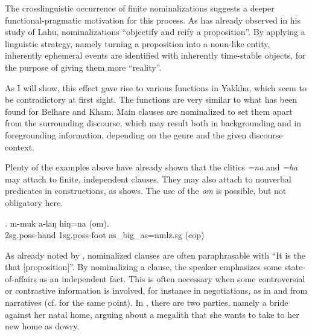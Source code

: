  The crosslinguistic occurrence of finite nominalizations suggests a deeper func\-tional-prag\-matic motivation for this process. As \citet[246]{Matisoff1972Lahu} has already observed in his study of Lahu, nominalizations “objectify and reify a proposition”. By applying a linguistic strategy, namely turning a proposition into a noun-like entity, inherently ephemeral events are identified with inherently time-stable objects, for the purpose of giving them more “reality”. 
 
As I will show, this effect gave rise to various functions in Yakkha, which seem to be  contradictory at first sight. The functions are very similar to what has been found for Belhare and Kham. Main clauses are nominalized to set them apart from the surrounding discourse, which may result both in backgrounding and in foregrounding information, depending on the genre and the given discourse context.

 




Plenty of the examples above have already shown that the clitics \emph{=na} and \emph{=ha} may attach to finite, independent clauses.  They may also attach to nonverbal predicates in  constructions, as \Next shows. The use of the   \emph{om} is possible, but not obligatory here.
	
	\exg. m-muk a-laŋ hiŋ=na (om).\\
 {\sc 2sg.poss-}hand {\sc 1sg.poss-}foot 	as\_big\_as{\sc =nmlz.sg} ({\sc cop})	\\
	
	
As already noted by \citet{Matisoff1972Lahu}, nominalized clauses are often paraphrasable with  “It is the  that [proposition]”. By nominalizing a clause, the speaker emphasizes some state-of-affairs as an independent fact. This is often necessary when some controversial or contrastive information is involved, for instance in negotiations, as in \Next and \NNext from narratives (cf. \citet{Bickel1999Nominalization} for the same point). In \Next, there are two parties, namely a bride against her natal home, arguing about  a megalith that she wants to take to her new home as dowry. 

